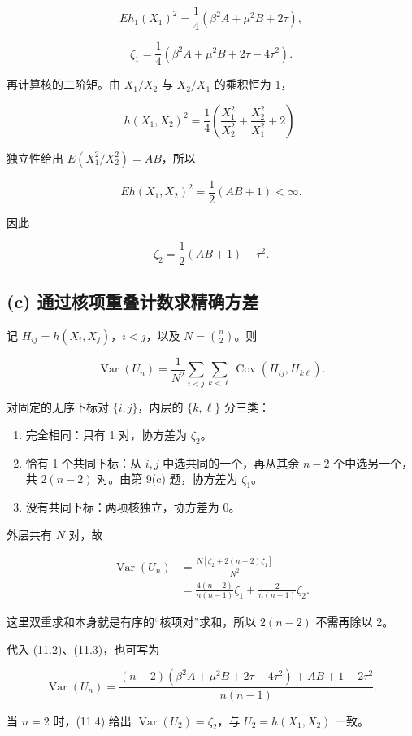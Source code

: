 \[
E h_1(X_1)^2=\frac14(\beta^2A+\mu^2B+2\tau),
\]

\[
\boxed{
\zeta_1
=\frac14(\beta^2A+\mu^2B+2\tau-4\tau^2).}
\tag{11.2}
\]

再计算核的二阶矩。由 $X_1/X_2$ 与 $X_2/X_1$ 的乘积恒为 1，

\[
h(X_1,X_2)^2
=\frac14\left(\frac{X_1^2}{X_2^2}
+\frac{X_2^2}{X_1^2}+2\right).
\]

独立性给出 $E(X_1^2/X_2^2)=AB$，所以

\[
E h(X_1,X_2)^2=\frac12(AB+1)<\infty.
\]

因此

\[
\boxed{\zeta_2=\frac12(AB+1)-\tau^2.}
\tag{11.3}
\]

\subsection{(c) 通过核项重叠计数求精确方差}

记 $H_{ij}=h(X_i,X_j)$，$i<j$，以及 $N=\binom n2$。则

\[
\operatorname{Var}(U_n)
=\frac1{N^2}
\sum_{i<j}\sum_{k<\ell}\operatorname{Cov}(H_{ij},H_{k\ell}).
\]

对固定的无序下标对 $\{i,j\}$，内层的 $\{k,\ell\}$ 分三类：

\begin{enumerate}
\item 完全相同：只有 1 对，协方差为 $\zeta_2$。
\item 恰有 1 个共同下标：从 $i,j$ 中选共同的一个，再从其余 $n-2$ 个中选另一个，共 $2(n-2)$ 对。由第 9(c) 题，协方差为 $\zeta_1$。
\item 没有共同下标：两项核独立，协方差为 0。

\end{enumerate}
外层共有 $N$ 对，故

\[
\begin{aligned}
\operatorname{Var}(U_n)
&=\frac{N[\zeta_2+2(n-2)\zeta_1]}{N^2}\\
&=\boxed{
\frac{4(n-2)}{n(n-1)}\zeta_1
+\frac2{n(n-1)}\zeta_2}.
\end{aligned}
\tag{11.4}
\]

这里双重求和本身就是有序的“核项对”求和，所以 $2(n-2)$ 不需再除以 2。

代入 (11.2)、(11.3)，也可写为

\[
\boxed{
\operatorname{Var}(U_n)=
\frac{(n-2)(\beta^2A+\mu^2B+2\tau-4\tau^2)
+AB+1-2\tau^2}{n(n-1)}.}
\tag{11.5}
\]

当 $n=2$ 时，(11.4) 给出 $\operatorname{Var}(U_2)=\zeta_2$，与 $U_2=h(X_1,X_2)$ 一致。

